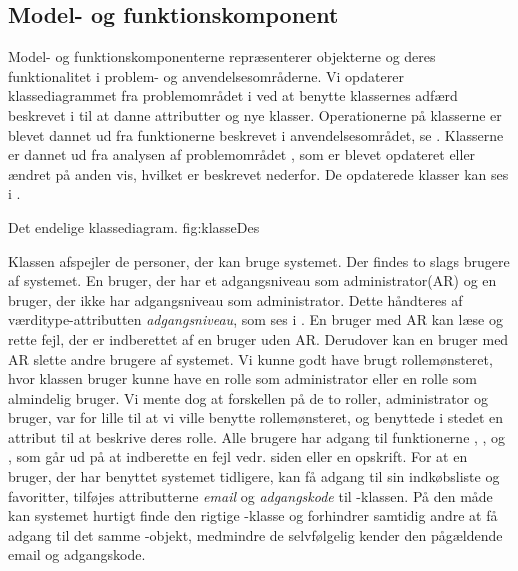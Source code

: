 \subsection{Model- og funktionskomponent}
\label{sec:modelfunktion}

Model- og funktionskomponenterne repræsenterer objekterne og deres funktionalitet i problem- og anvendelsesområderne. Vi opdaterer klassediagrammet fra problemområdet i  ved at benytte klassernes adfærd beskrevet i  til at danne attributter og nye klasser. Operationerne på klasserne er blevet dannet ud fra funktionerne beskrevet i anvendelsesområdet, se . Klasserne er dannet ud fra analysen af problemområdet , som er blevet opdateret eller ændret på anden vis, hvilket er beskrevet nederfor. De opdaterede klasser kan ses i .



	{Det endelige klassediagram.}
	{fig:klasseDes}


Klassen  afspejler de personer, der kan bruge systemet. Der findes to slags brugere af systemet. En bruger, der har et adgangsniveau som administrator(AR) og en bruger, der ikke har adgangsniveau som administrator. Dette håndteres af værditype-attributten \textit{adgangsniveau}, som ses i . En bruger med AR kan læse og rette fejl, der er indberettet af en bruger uden AR. Derudover kan en bruger med AR slette andre brugere af systemet. Vi kunne godt have brugt rollemønsteret, hvor klassen bruger kunne have en rolle som administrator eller en rolle som almindelig bruger. Vi mente dog at forskellen på de to roller, administrator og bruger, var for lille til at vi ville benytte rollemønsteret, og benyttede i stedet en attribut til at beskrive deres rolle. Alle brugere har adgang til funktionerne , ,  og , som går ud på at indberette en fejl vedr. siden eller en opskrift.
For at en bruger, der har benyttet systemet tidligere, kan få adgang til sin indkøbsliste og favoritter, tilføjes attributterne \textit{email} og \textit{adgangskode} til -klassen. På den måde kan systemet hurtigt finde den rigtige -klasse og forhindrer samtidig andre at få adgang til det samme -objekt, medmindre de selvfølgelig kender den pågældende email og adgangskode.

